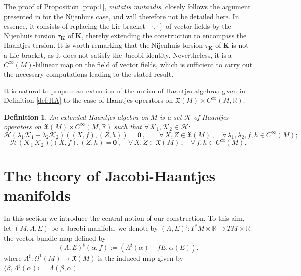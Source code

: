 \documentclass[10pt]{amsart}
\numberwithin{equation}{section}
\newcommand{\beq}{\begin{equation}}
\newcommand{\eeq}{\end{equation}}
\newcommand{\bs}{\boldsymbol}
\newcommand{\cH}{\mathcal{H}}
\newtheorem{definition}{Definition}
\theoremstyle{definition}
\begin{document}
The proof of Proposition \ref{prop:1}, \textit{mutatis mutandis}, closely follows the argument presented in \cite{nunes1999some,PNJGP2003} for the Nijenhuis case, and will therefore not be detailed here. In essence, it consists of replacing the Lie bracket $[\cdot, \cdot]$ of vector fields by the Nijenhuis torsion $\tau_{\bs{K}}$ of $\bs{K}$, thereby extending the construction to encompass the Haantjes torsion. It is worth remarking that the Nijenhuis torsion $\tau_{\bs{K}}$ of $\bs{K}$ is not a Lie bracket, as it does not satisfy the Jacobi identity. Nevertheless, it is a $C^{\infty}(M)$-bilinear map on the field of vector fields, which is sufficient to carry out the necessary computations leading to the stated result.
\vspace{2mm}

It is natural to propose an extension of the notion of Haantjes algebras given in Definition \ref{def:HA} to the case of Haantjes operators on  $\mathfrak{X}(M)\times C^{\infty}(M, \mathbb{R})$.
\begin{definition}
An extended Haantjes algebra on $M$ is a set $\mathscr{H}$ of Haantjes operators on $\mathfrak{X}(M)\times C^{\infty}(M, \mathbb{R})$ such that $\forall \, \bs{\mathcal{K}}_1, \bs{\mathcal{K}}_2\in \mathscr{H}$:
\begin{equation}
\label{eq:Hmodextend}
\cH\left( \lambda_1\bs{\mathcal{K}}_{1} +\lambda_2\bs{\mathcal{K}}_2 \right)((X,f),(Z,h))= \mathbf{0}
 \, , \qquad\forall\, X, Z \in \mathfrak{X}(M) \, , \quad \forall\, \lambda_1, \lambda_2, f,h  \in C^\infty(M);
\end{equation}
\begin{equation}
 \label{eq:Hringextend}
\cH(\bs{\mathcal{K}}_1 \, \bs{\mathcal{K}}_2)((X,f),(Z,h)=\mathbf{0} \, ,  \quad\forall\, X, Z \in \mathfrak{X}(M)\, , \quad \forall\, f,h  \in C^\infty(M).
\end{equation}
\end{definition}





\section{The theory of Jacobi-Haantjes manifolds}
\label{sec4}

In this section we introduce the central notion of our construction. To this aim, let $(M,\Lambda,E)$ be a Jacobi manifold, we denote by $(\Lambda, E)^{\sharp}: T^{*}M\times \mathbb{R}\to TM\times \mathbb{R}$ the vector bundle map defined by
\beq
(\Lambda, E)^{\sharp}(\alpha, f):= (\Lambda^{\sharp}(\alpha)-fE, \alpha(E)).
\eeq
where $\Lambda^{\sharp}:\Omega^{1}(M)\longrightarrow\mathfrak{X}(M)$ is the induced map given by  $\langle \beta, \Lambda^{\sharp}(\alpha)\rangle= \Lambda(\beta,\alpha)$.
\end{document}
